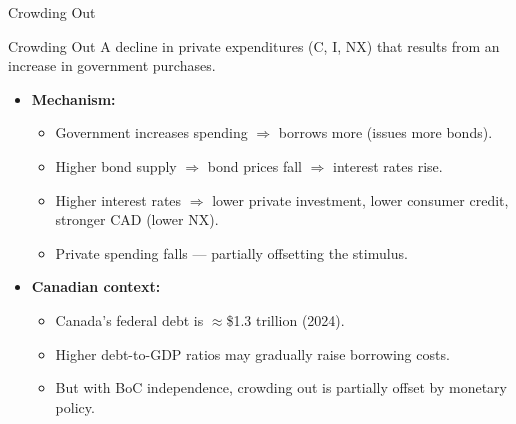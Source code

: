 \documentclass[aspectratio=169]{beamer}
\begin{document}
\begin{frame}{Crowding Out}
\transfade
\begin{block}{Crowding Out}
A decline in private expenditures (C, I, NX) that results from an increase in government purchases.
\end{block}
\begin{itemize}[<+->]
  \item \textbf{Mechanism:}
  \begin{itemize}[<+->]
    \item Government increases spending $\Rightarrow$ borrows more (issues more bonds).
    \item Higher bond supply $\Rightarrow$ bond prices fall $\Rightarrow$ interest rates rise.
    \item Higher interest rates $\Rightarrow$ lower private investment, lower consumer credit, stronger CAD (lower NX).
    \item Private spending falls --- partially offsetting the stimulus.
  \end{itemize}
  \item \textbf{Canadian context:}
  \begin{itemize}[<+->]
    \item Canada's federal debt is $\approx$\$1.3 trillion (2024).
    \item Higher debt-to-GDP ratios may gradually raise borrowing costs.
    \item But with BoC independence, crowding out is partially offset by monetary policy.
  \end{itemize}
\end{itemize}
\end{frame}
\end{document}
